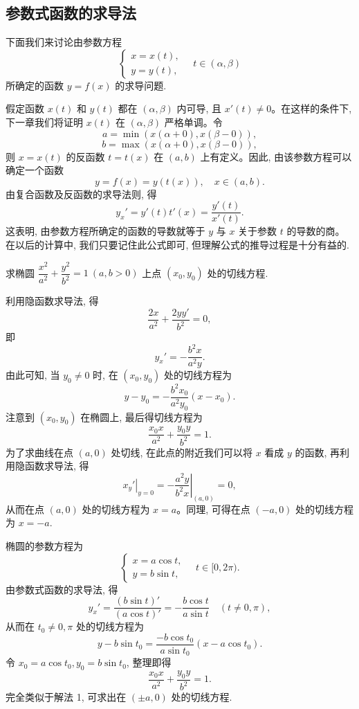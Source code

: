 \subsection{参数式函数的求导法}
\label{subsec:ma-4-2-5}

下面我们来讨论由参数方程
\[
  \begin{cases}
    x=x(t),\\
    y=y(t),
  \end{cases}
  \quad t\in(\alpha,\beta)
\]
所确定的函数 $y=f(x)$ 的求导问题.

假定函数 $x(t)$ 和 $y(t)$ 都在 $(\alpha,\beta)$ 内可导, 且 $x'(t)\ne0$。在这样的条件下, 下一章我们将证明 $x(t)$ 在 $(\alpha,\beta)$ 严格单调。令
\[
  a=\min(x(\alpha+0),x(\beta-0)),
\]
\[
  b=\max(x(\alpha+0),x(\beta-0)),
\]
则 $x=x(t)$ 的反函数 $t=t(x)$ 在 $(a,b)$ 上有定义。因此, 由该参数方程可以确定一个函数
\[
  y=f(x)=y(t(x)),\quad x\in(a,b).
\]
由复合函数及反函数的求导法则, 得
\[
  y_x'=y'(t)t'(x)=\frac{y'(t)}{x'(t)}.
\]
这表明, 由参数方程所确定的函数的导数就等于 $y$ 与 $x$ 关于参数 $t$ 的导数的商。在以后的计算中, 我们只要记住此公式即可, 但理解公式的推导过程是十分有益的.

\begin{example}\label{example:ma-4-2-13}
求椭圆 $\dfrac{x^2}{a^2}+\dfrac{y^2}{b^2}=1\ (a,b>0)$ 上点 $(x_0,y_0)$ 处的切线方程.
\end{example}


\begin{solve}[{解法 1}]
利用隐函数求导法, 得
\[
  \frac{2x}{a^2}+\frac{2yy'}{b^2}=0,
\]
即
\[
  y_x'=-\frac{b^2x}{a^2y}.
\]
由此可知, 当 $y_0\ne0$ 时, 在 $(x_0,y_0)$ 处的切线方程为
\[
  y-y_0=-\frac{b^2x_0}{a^2y_0}(x-x_0).
\]
注意到 $(x_0,y_0)$ 在椭圆上, 最后得切线方程为
\[
  \frac{x_0x}{a^2}+\frac{y_0y}{b^2}=1.
\]
为了求曲线在点 $(a,0)$ 处切线, 在此点的附近我们可以将 $x$ 看成 $y$ 的函数, 再利用隐函数求导法, 得
\[
  \left.x_y'\right|_{y=0}
  =
  -\left.\frac{a^2y}{b^2x}\right|_{(a,0)}
  =
  0,
\]
从而在点 $(a,0)$ 处的切线方程为 $x=a$。同理, 可得在点 $(-a,0)$ 处的切线方程为 $x=-a$.
\end{solve}


\begin{solve}[{解法 2}]
椭圆的参数方程为
\[
  \begin{cases}
    x=a\cos t,\\
    y=b\sin t,
  \end{cases}
  \quad t\in[0,2\pi).
\]
由参数式函数的求导法, 得
\[
  y_x'=\frac{(b\sin t)'}{(a\cos t)'}
  =
  -\frac{b\cos t}{a\sin t}
  \quad(t\ne0,\pi),
\]
从而在 $t_0\ne0,\pi$ 处的切线方程为
\[
  y-b\sin t_0=
  \frac{-b\cos t_0}{a\sin t_0}(x-a\cos t_0).
\]
令 $x_0=a\cos t_0,y_0=b\sin t_0$, 整理即得
\[
  \frac{x_0x}{a^2}+\frac{y_0y}{b^2}=1.
\]
完全类似于解法 1, 可求出在 $(\pm a,0)$ 处的切线方程.
\end{solve}


